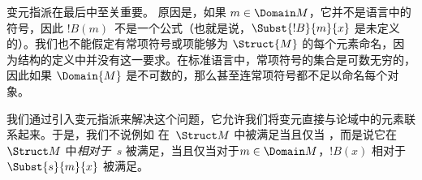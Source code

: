 \documentclass[../../../include/open-logic-section]{subfiles}
\begin{document}
\begin{explain}
变元指派在最后中至关重要。 原因是，如果 $m \in \Domain M$，它并不是语言中的符号，因此 $!B(m)$~不是一个公式（也就是说，$\Subst{!B}{m}{x}$ 是未定义的）。我们也不能假定有常项符号或项能够为 $\Struct{M}$ 的每个元素命名，因为结构的定义中并没有这一要求。在标准语言中，常项符号的集合是可数无穷的，因此如果 $\Domain{M}$ 是不可数的，那么甚至连常项符号都不足以命名每个对象。

我们通过引入变元指派来解决这个问题，它允许我们将变元直接与论域中的元素联系起来。于是，我们不说例如  在~$\Struct M$ 中被满足当且仅当 ，而是说它在~$\Struct M$ 中\emph{相对于}~$s$ 被满足，当且仅当对于$m \in \Domain M$，$!B(x)$ 相对于~$\Subst{s}{m}{x}$ 被满足。
\end{explain}
\end{document}
